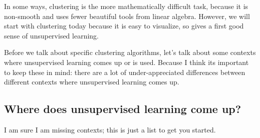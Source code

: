 In some ways, clustering is the more mathematically difficult task, because it is non-smooth and uses fewer beautiful tools from linear algebra. However, we will start with clustering today because it is easy to visualize, so gives a first good sense of unsupervised learning. 

Before we talk about specific clustering algorithms, let's talk about some contexts where unsupervised learning comes up or is used. Because I think its important to keep these in mind: there are a lot of under-appreciated differences between different contexts where unsupervised learning comes up. 

\subsection{Where does unsupervised learning come up?}

I am sure I am missing contexts; this is just a list to get you started. 

